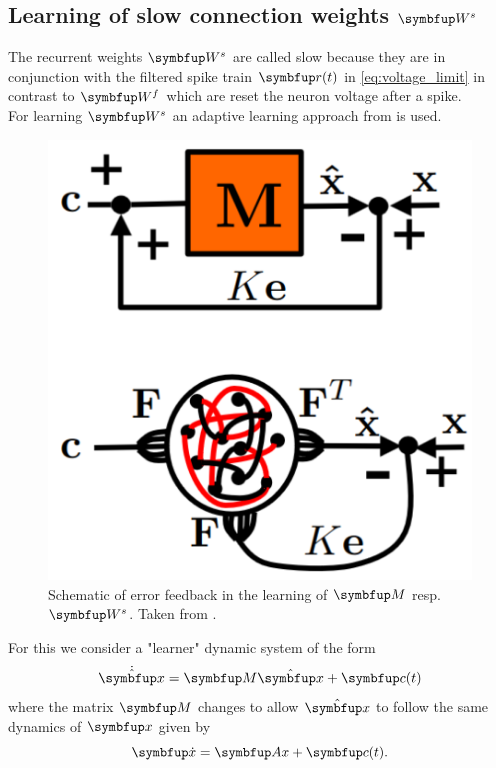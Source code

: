 \subsection{Learning of slow connection weights $\bmu{W}^s$}
The recurrent weights $\bmu{W}^s$ are called slow because they are in conjunction with the filtered spike train $\bmu{r}(t)$ in \cref{eq:voltage_limit} in contrast to $\bmu{W}^f$ which are reset the neuron voltage after a spike.\\
For learning $\bmu{W}^s$ an adaptive learning approach from \cite{bourdoukan_enforcing_2015} is used.\\
\begin{figure}[H]
	\centering
	\includegraphics[scale = 0.15]{screenshots/error_feedback_Ws.png}
	\caption{Schematic of error feedback in the learning of $\bmu{M}$ resp. $\bmu{W}^s$. Taken from \cite{bourdoukan_enforcing_2015}.}
	\label{fig:error_feedback_Ws}
\end{figure}
For this we consider a "learner" dynamic system of the form
\begin{equation}
	\dot{\hat{\bmu{x}}} = \bmu{M}\hat{\bmu{x}} + \bmu{c}(t)
\end{equation}
where the matrix $\bmu{M}$ changes to allow $\hat{\bmu{x}}$ to follow the same dynamics of $\bmu{x}$ given by
\begin{equation}\label{eq:teacher}
	\bmu{\dot{x}} = \bmu{Ax} + \bmu{c}(t).
\end{equation}

